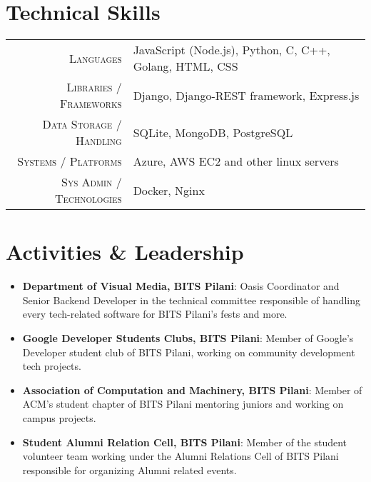 \documentclass[a4paper,10pt]{extarticle} %
\begin{document}
\section{\textcolor{primary}{Technical Skills}}
\vspace{0.2cm}

\begin{tabular}{r|p{15cm}}
\textsc{Languages} & JavaScript (Node.js), Python, C, C++, Golang, HTML, CSS \\
\textsc{Libraries / Frameworks} & Django, Django-REST framework, Express.js \\
\textsc{Data Storage / Handling} & SQLite, MongoDB, PostgreSQL \\
\textsc{Systems / Platforms} & Azure, AWS EC2 and other linux servers \\
\textsc{Sys Admin / Technologies} & Docker, Nginx\\

\end{tabular}


\vspace{0.4cm}
\section{\textcolor{primary}{Activities \& Leadership}}

\begin{itemize}[leftmargin=0.55cm, rightmargin=0.2cm, label={\Large\textbullet}]
\vspace{0.2cm}
\item \textbf{Department of Visual Media, BITS Pilani}: Oasis Coordinator and Senior Backend Developer in the technical committee responsible of handling every tech-related software for BITS Pilani's fests and more. 

\item \textbf{Google Developer Students Clubs, BITS Pilani}: Member of Google's Developer student club of BITS Pilani, working on community development tech projects.

\item\textbf{Association of Computation and Machinery, BITS Pilani}: Member of ACM's student chapter of BITS Pilani mentoring juniors and working on campus projects.

\item\textbf{Student Alumni Relation Cell, BITS Pilani}: Member of the student volunteer team working under the Alumni Relations Cell of BITS Pilani responsible for organizing Alumni related events.\\

\end{itemize}
\end{document}
